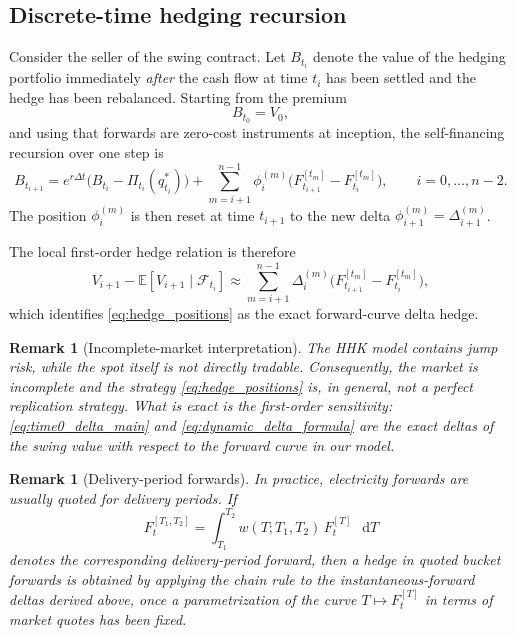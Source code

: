 \documentclass[10pt,a4paper,reqno]{amsart}
\newcommand{\<}{\langle}
\renewcommand{\>}{\rangle}
\newtheorem{remark}[theorem]{Remark}
\theoremstyle{example}
\newcommand*\D{\mathop{}\!\mathrm{d}}
\begin{document}
\subsection{Discrete-time hedging recursion}

Consider the seller of the swing contract. Let $B_{t_i}$ denote the value of the hedging portfolio
immediately \emph{after} the cash flow at time $t_i$ has been settled and the hedge has been rebalanced.
Starting from the premium
\[
B_{t_0}=V_0,
\]
and using that forwards are zero-cost instruments at inception, the self-financing recursion over one step is
\begin{equation}
\label{eq:self_financing_recursion}
B_{t_{i+1}}
=
e^{r\Delta t}
\Big(
B_{t_i}
-
\Pi_{t_i}(q_{t_i}^*)
\Big)
+
\sum_{m=i+1}^{n-1}
\phi_i^{(m)}
\Big(
F_{t_{i+1}}^{[t_m]} - F_{t_i}^{[t_m]}
\Big),
\qquad i=0,\dots,n-2.
\end{equation}
The position $\phi_i^{(m)}$ is then reset at time $t_{i+1}$ to the new delta
$\phi_{i+1}^{(m)}=\Delta_{i+1}^{(m)}$.

The local first-order hedge relation is therefore
\begin{equation}
\label{eq:first_order_hedge_relation}
V_{i+1}-\mathbb{E}[V_{i+1}\mid \mathcal{F}_{t_i}]
\approx
\sum_{m=i+1}^{n-1}
\Delta_i^{(m)}
\Big(
F_{t_{i+1}}^{[t_m]} - F_{t_i}^{[t_m]}
\Big),
\end{equation}
which identifies \eqref{eq:hedge_positions} as the exact forward-curve delta hedge.

\begin{remark}[Incomplete-market interpretation]
\label{rem:incomplete_market}
The HHK model contains jump risk, while the spot itself is not directly tradable. Consequently, the
market is incomplete and the strategy \eqref{eq:hedge_positions} is, in general, not a perfect replication
strategy. What is exact is the \emph{first-order sensitivity}: \eqref{eq:time0_delta_main} and
\eqref{eq:dynamic_delta_formula} are the exact deltas of the swing value with respect to the forward
curve in our model.
\end{remark}

\begin{remark}[Delivery-period forwards]
\label{rem:delivery_period_forwards}
In practice, electricity forwards are usually quoted for delivery periods. If
\[
F_t^{[T_1,T_2]}
=
\int_{T_1}^{T_2}
w(T;T_1,T_2)\,F_t^{[T]}\,\D T
\]
denotes the corresponding delivery-period forward, then a hedge in quoted bucket forwards is obtained
by applying the chain rule to the instantaneous-forward deltas derived above, once a parametrization of
the curve $T \mapsto F_t^{[T]}$ in terms of market quotes has been fixed.
\end{remark}
\end{document}

